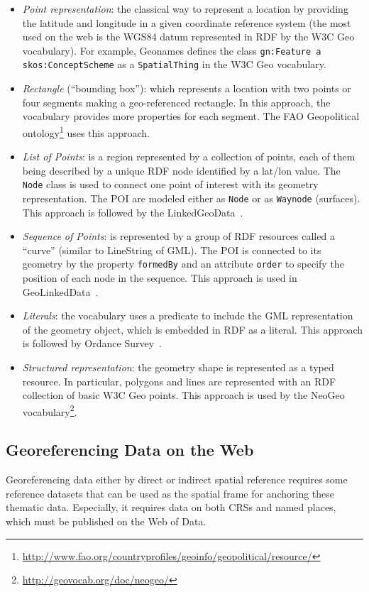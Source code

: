 \begin{itemize}
  \item \textit{Point representation}: the classical way to represent a location by providing the latitude and longitude in a given coordinate reference system (the most used on the web is the WGS84 datum represented in RDF by the W3C Geo vocabulary). For example, Geonames defines the class \texttt{gn:Feature a skos:ConceptScheme} as a \texttt{SpatialThing} in the W3C Geo vocabulary.
  
  \item \textit{Rectangle} (``bounding box''): which represents a location with two points or four segments making a geo-referenced rectangle. In this approach, the vocabulary provides more properties for each segment. The FAO Geopolitical ontology\footnote{\url{http://www.fao.org/countryprofiles/geoinfo/geopolitical/resource/}} uses this approach.
  
  \item \textit{List of Points}: is a region represented by a collection of points, each of them being described by a unique RDF node identified by a lat/lon value. The \texttt{Node} class is used to connect one point of interest with its geometry representation. The POI are modeled either as \texttt{Node} or as \texttt{Waynode} (surfaces). This approach is followed by the LinkedGeoData~\cite{linkedgeodata}.
  
  \item \textit{Sequence of Points}: is represented by a group of RDF resources called a ``curve'' (similar to LineString of GML). The POI is connected to its geometry by the property \texttt{formedBy} and an attribute \texttt{order} to specify the position of each node in the sequence. This approach is used in GeoLinkedData~\cite{deLeon2010}.
  \item \textit{Literals}: the vocabulary uses a predicate to include the GML representation of the geometry object, which is embedded in RDF as a literal. This approach is followed by Ordance Survey~\cite{Goodwin2008}.
  \item \textit{Structured representation}: the geometry shape is represented as a typed resource. In particular, polygons and lines are represented with an RDF collection of basic W3C Geo points. This approach is used by the NeoGeo vocabulary\footnote{\url{http://geovocab.org/doc/neogeo/}}.
\end{itemize}




\subsection{Georeferencing Data on the Web}
\label{sec:georef}
Georeferencing data either by direct or indirect spatial reference requires some reference datasets that can be used as the spatial frame for anchoring these thematic data. Especially, it requires data on both CRSs and named places, which must be published on the Web of Data.


